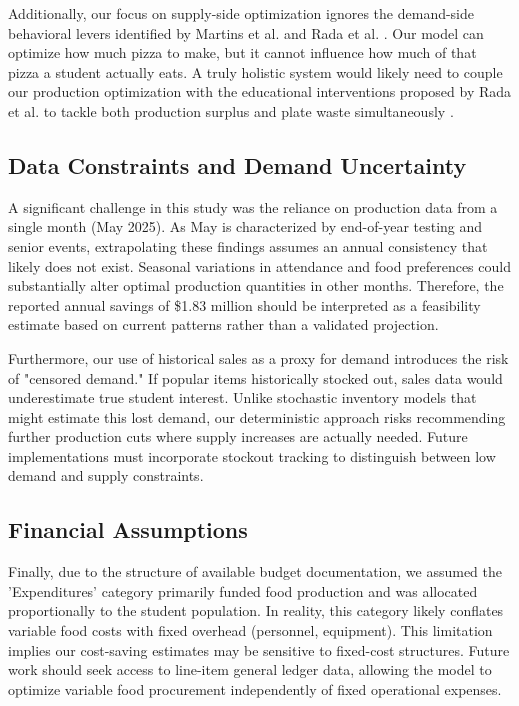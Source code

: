 \documentclass{scrartcl}
\begin{document}
Additionally, our focus on supply-side optimization ignores the demand-side behavioral levers identified by Martins et al. and Rada et al. \cite{factors, rada}. Our model can optimize how much pizza to make, but it cannot influence how much of that pizza a student actually eats. A truly holistic system would likely need to couple our production optimization with the educational interventions proposed by Rada et al. to tackle both production surplus and plate waste simultaneously \cite{rada}.

\subsection{Data Constraints and Demand Uncertainty}

A significant challenge in this study was the reliance on production data from a single month (May 2025). As May is characterized by end-of-year testing and senior events, extrapolating these findings assumes an annual consistency that likely does not exist. Seasonal variations in attendance and food preferences could substantially alter optimal production quantities in other months. Therefore, the reported annual savings of \$1.83 million should be interpreted as a feasibility estimate based on current patterns rather than a validated projection.

Furthermore, our use of historical sales as a proxy for demand introduces the risk of "censored demand." If popular items historically stocked out, sales data would underestimate true student interest. Unlike stochastic inventory models that might estimate this lost demand, our deterministic approach risks recommending further production cuts where supply increases are actually needed. Future implementations must incorporate stockout tracking to distinguish between low demand and supply constraints.

\subsection{Financial Assumptions}

Finally, due to the structure of available budget documentation, we assumed the 'Expenditures' category primarily funded food production and was allocated proportionally to the student population. In reality, this category likely conflates variable food costs with fixed overhead (personnel, equipment). This limitation implies our cost-saving estimates may be sensitive to fixed-cost structures. Future work should seek access to line-item general ledger data, allowing the model to optimize variable food procurement independently of fixed operational expenses.
\end{document}
